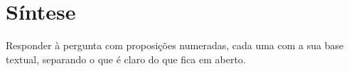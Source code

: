 \chapter{Síntese}

\begin{objetivo}
Responder à pergunta com proposições numeradas, cada uma com a sua base
textual, separando o que é claro do que fica em aberto.
\end{objetivo}


